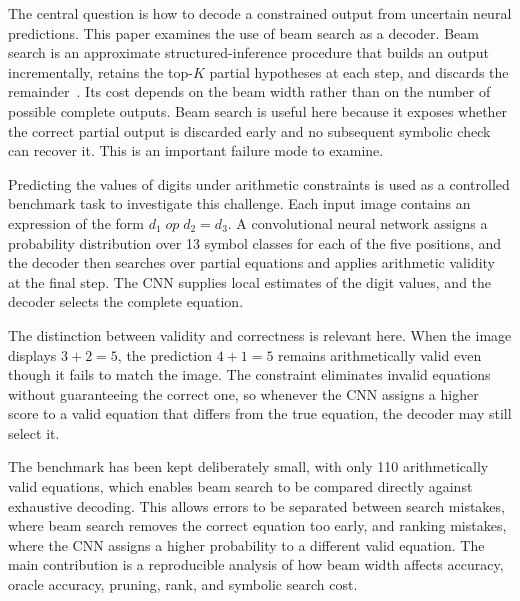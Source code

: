 \documentclass[12pt]{article}
\begin{document}
The central question is how to decode a constrained output from uncertain neural predictions. This paper examines the use of beam search as a decoder. Beam search is an approximate structured-inference procedure that builds an output incrementally, retains the top-$K$ partial hypotheses at each step, and discards the remainder~\cite{collins2004,sutskever2014,bahdanau2015}. Its cost depends on the beam width rather than on the number of possible complete outputs. Beam search is useful here because it exposes whether the correct partial output is discarded early and no subsequent symbolic check can recover it. This is an important failure mode to examine.

Predicting the values of digits under arithmetic constraints is used as a controlled benchmark task to investigate this challenge. Each input image contains an expression of the form $d_1 \; op \; d_2 = d_3$. A convolutional neural network assigns a probability distribution over 13 symbol classes for each of the five positions, and the decoder then searches over partial equations and applies arithmetic validity at the final step. The CNN supplies local estimates of the digit values, and the decoder selects the complete equation.

The distinction between validity and correctness is relevant here. When the image displays $3+2=5$, the prediction $4+1=5$ remains arithmetically valid even though it fails to match the image. The constraint eliminates invalid equations without guaranteeing the correct one, so whenever the CNN assigns a higher score to a valid equation that differs from the true equation, the decoder may still select it.

The benchmark has been kept deliberately small, with only 110 arithmetically valid equations, which enables beam search to be compared directly against exhaustive decoding. This allows errors to be separated between search mistakes, where beam search removes the correct equation too early, and ranking mistakes, where the CNN assigns a higher probability to a different valid equation. The main contribution is a reproducible analysis of how beam width affects accuracy, oracle accuracy, pruning, rank, and symbolic search cost.
\end{document}
